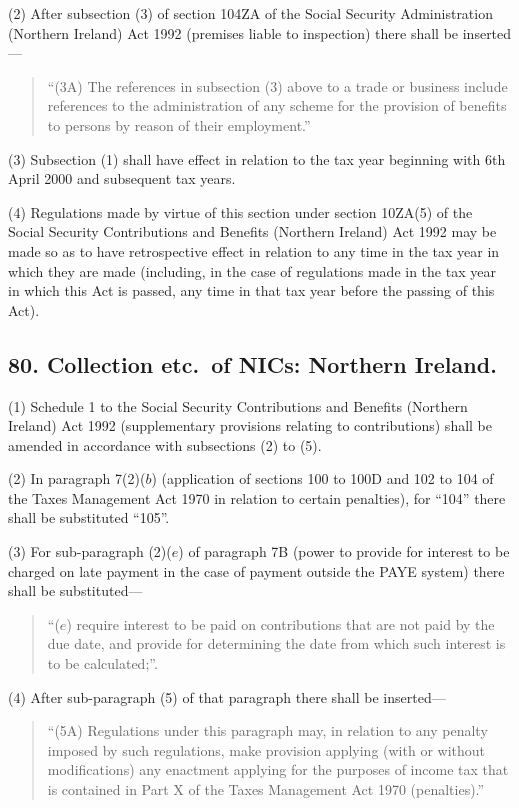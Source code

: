 \documentclass[12pt,a4paper]{article}
\begin{document}
(2) After subsection (3)  of section 104ZA of the Social Security Administration (Northern Ireland) Act 1992 (premises liable to inspection) there shall be inserted—
\begin{quotation}
“(3A) The references in subsection (3)  above to a trade or business include references to the administration of any scheme for the provision of benefits to persons by reason of their employment.”
\end{quotation}

(3) Subsection (1)  shall have effect in relation to the tax year beginning with 6th April 2000 and subsequent tax years.

(4) Regulations made by virtue of this section under section 10ZA(5)  of the  Social Security Contributions and Benefits (Northern Ireland) Act 1992 may be made so as to have retrospective effect in relation to any time in the tax year in which they are made (including, in the case of regulations made in the tax year in which this Act is passed, any time in that tax year before the passing of this Act).

\subsection{80. Collection etc.\ of NICs: Northern Ireland.}

(1) Schedule 1 to the Social Security Contributions and Benefits (Northern Ireland) Act 1992 (supplementary provisions relating to contributions) shall be amended in accordance with subsections (2)  to (5).

(2) In paragraph 7(2)($b$)  (application of sections 100 to 100D and 102 to 104 of the Taxes Management Act 1970 in relation to certain penalties), for “104” there shall be substituted “105”.

(3) For sub-paragraph (2)($e$)  of paragraph 7B (power to provide for interest to be charged on late payment in the case of payment outside the PAYE system) there shall be substituted—
\begin{quotation}
“($e$) require interest to be paid on contributions that are not paid by the due date, and provide for determining the date from which such interest is to be calculated;”.
\end{quotation}

(4) After sub-paragraph (5)  of that paragraph there shall be inserted—
\begin{quotation}
“(5A) Regulations under this paragraph may, in relation to any penalty imposed by such regulations, make provision applying (with or without modifications) any enactment applying for the purposes of income tax that is contained in Part X of the Taxes Management Act 1970 (penalties).”
\end{quotation}
\end{document}
